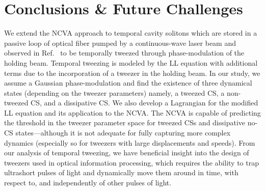 \documentclass[aps,floatfix,showpacs,preprintnumbers,twocolumn,nofootinbib]{revtex4}
\begin{document}
\section{Conclusions \& Future Challenges
\label{secConclusion}}

We extend the NCVA approach to temporal cavity solitons which are stored in a passive loop of optical fiber pumped by a continuous-wave laser beam and observed in Ref.~\cite{tweeze} to be temporally tweezed through phase-modulation of the holding beam.  Temporal tweezing is modeled by the LL equation with additional terms due to the incorporation of a tweezer in the holding beam.  In our study, we assume a Gaussian phase-modulation and find the existence of three dynamical states (depending on the tweezer parameters) namely, a tweezed CS, a non-tweezed CS, and a dissipative CS.  We also develop a Lagrangian for the modified LL equation and its application to the NCVA.  The NCVA is capable of predicting the threshold in the tweezer parameter space for tweezed CSs and dissipative no-CS states---although it is not adequate for fully capturing more complex dynamics (especially so for tweezers with large displacements and speeds).  From our analysis of temporal tweezing, we have beneficial insight into the design of tweezers used in optical information processing, which requires the ability to trap ultrashort pulses of light and dynamically move them around in time, with respect to, and independently of other pulses of light.
%
\end{document}

